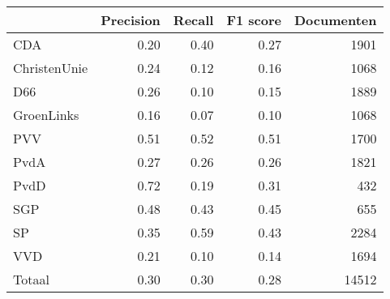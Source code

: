 \begin{tabular}{lrrrr}
\toprule
{} &  Precision &  Recall &  F1 score &  Documenten \\
\midrule
CDA          &       0.20 &    0.40 &      0.27 &        1901 \\
ChristenUnie &       0.24 &    0.12 &      0.16 &        1068 \\
D66          &       0.26 &    0.10 &      0.15 &        1889 \\
GroenLinks   &       0.16 &    0.07 &      0.10 &        1068 \\
PVV          &       0.51 &    0.52 &      0.51 &        1700 \\
PvdA         &       0.27 &    0.26 &      0.26 &        1821 \\
PvdD         &       0.72 &    0.19 &      0.31 &         432 \\
SGP          &       0.48 &    0.43 &      0.45 &         655 \\
SP           &       0.35 &    0.59 &      0.43 &        2284 \\
VVD          &       0.21 &    0.10 &      0.14 &        1694 \\
Totaal       &       0.30 &    0.30 &      0.28 &       14512 \\
\bottomrule
\end{tabular}

